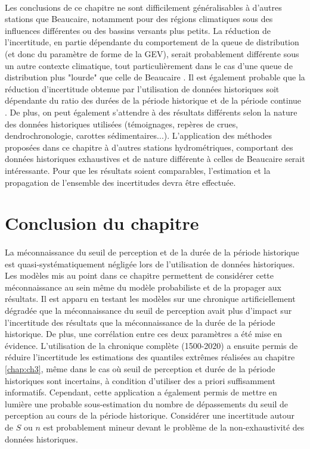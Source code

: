 	\paragraph{} Les conclusions de ce chapitre ne sont difficilement généralisables à d'autres stations que Beaucaire, notamment pour des régions climatiques sous des influences différentes ou des bassins versants plus petits. La réduction de l'incertitude, en partie dépendante du comportement de la queue de distribution (et donc du paramètre de forme de la GEV), serait probablement différente sous un autre contexte climatique, tout particulièrement dans le cas d'une queue de distribution plus "lourde" que celle de Beaucaire \citep{merz_understanding_2022}. Il est également probable que la réduction d'incertitude obtenue par l'utilisation de données historiques soit dépendante du ratio des durées de la période historique et de la période continue \citep{payrastre_usefulness_2011}. De plus, on peut également s'attendre à des résultats différents selon la nature des données historiques utilisées (témoignages, repères de crues, dendrochronologie, carottes sédimentaires...). L'application des méthodes proposées dans ce chapitre à d'autres stations hydrométriques, comportant des données historiques exhaustives et de nature différente à celles de Beaucaire serait intéressante. Pour que les résultats soient comparables, l'estimation et la propagation de l'ensemble des incertitudes devra être effectuée. 
		
	
\section{Conclusion du chapitre}
\label{sec:Conclu}
	\paragraph{} La méconnaissance du seuil de perception et de la durée de la période historique est quasi-systématiquement négligée lors de l'utilisation de données historiques. Les modèles mis au point dans ce chapitre permettent de considérer cette méconnaissance au sein même du modèle probabiliste et de la propager aux résultats. Il est apparu en testant les modèles sur une chronique artificiellement dégradée que la méconnaissance du seuil de perception avait plus d'impact sur l'incertitude des résultats que la méconnaissance de la durée de la période historique. De plus, une corrélation entre ces deux paramètres a été mise en évidence. L'utilisation de la chronique complète (1500-2020) a ensuite permis de réduire l'incertitude les estimations des quantiles extrêmes réalisées au chapitre \ref{chap:ch3}, même dans le cas où seuil de perception et durée de la période historiques sont incertains, à condition d'utiliser des a priori suffisamment informatifs. Cependant, cette application a également permis de mettre en lumière une probable sous-estimation du nombre de dépassements du seuil de perception au cours de la période historique. Considérer une incertitude autour de $S$ ou $n$ est probablement mineur devant le problème de la non-exhaustivité des données historiques.

